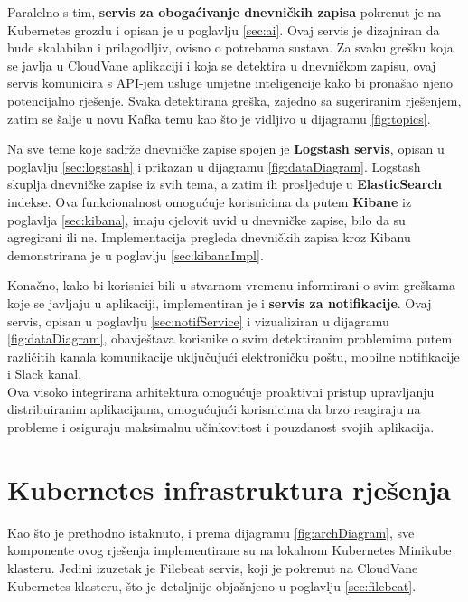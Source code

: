 \documentclass[times, utf8, diplomski]{fer}
\begin{document}
Paralelno s tim, \textbf{servis za obogaćivanje dnevničkih zapisa} pokrenut je na Kubernetes grozdu i opisan je u poglavlju \ref{sec:ai}. Ovaj servis je dizajniran da bude skalabilan i prilagodljiv, ovisno o potrebama sustava. Za svaku grešku koja se javlja u CloudVane aplikaciji i koja se detektira u dnevničkom zapisu, ovaj servis komunicira s API-jem usluge umjetne inteligencije kako bi pronašao njeno potencijalno rješenje. Svaka detektirana greška, zajedno sa sugeriranim rješenjem, zatim se šalje u novu Kafka temu kao što je vidljivo u dijagramu \ref{fig:topics}.

Na sve teme koje sadrže dnevničke zapise spojen je \textbf{Logstash servis}, opisan u poglavlju \ref{sec:logstash} i prikazan u dijagramu \ref{fig:dataDiagram}. Logstash skuplja dnevničke zapise iz svih tema, a zatim ih prosljeđuje u \textbf{ElasticSearch} indekse. Ova funkcionalnost omogućuje korisnicima da putem \textbf{Kibane} iz poglavlja \ref{sec:kibana}, imaju cjelovit uvid u dnevničke zapise, bilo da su agregirani ili ne. Implementacija pregleda dnevničkih zapisa kroz Kibanu demonstrirana je u poglavlju \ref{sec:kibanaImpl}.

Konačno, kako bi korisnici bili u stvarnom vremenu informirani o svim greškama koje se javljaju u aplikaciji, implementiran je i \textbf{servis za notifikacije}. Ovaj servis, opisan u poglavlju \ref{sec:notifService} i vizualiziran u dijagramu \ref{fig:dataDiagram}, obavještava korisnike o svim detektiranim problemima putem različitih kanala komunikacije uključujući elektroničku poštu, mobilne notifikacije i Slack kanal.\\

Ova visoko integrirana arhitektura omogućuje proaktivni pristup upravljanju distribuiranim aplikacijama, omogućujući korisnicima da brzo reagiraju na probleme i osiguraju maksimalnu učinkovitost i pouzdanost svojih aplikacija.


\section{Kubernetes infrastruktura rješenja}
\label{sec:localKubernetes}

Kao što je prethodno istaknuto, i prema dijagramu \ref{fig:archDiagram}, sve komponente ovog rješenja implementirane su na lokalnom Kubernetes Minikube klasteru. Jedini izuzetak je Filebeat servis, koji je pokrenut na CloudVane Kubernetes klasteru, što je detaljnije objašnjeno u poglavlju \ref{sec:filebeat}.\\
\end{document}
